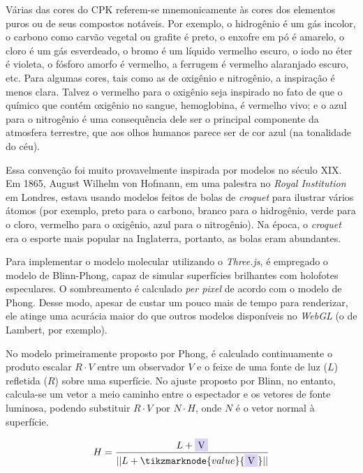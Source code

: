 Várias das cores do \gls{CPK} referem-se mnemonicamente às cores dos elementos puros ou de seus compostos notáveis. Por exemplo, o hidrogênio é um gás incolor, o carbono como carvão vegetal ou grafite é preto, o enxofre em pó é amarelo, o cloro é um gás esverdeado, o bromo é um líquido vermelho escuro, o iodo no éter é violeta, o fósforo amorfo é vermelho, a ferrugem é vermelho alaranjado escuro, etc. Para algumas cores, tais como as de oxigênio e nitrogênio, a inspiração é menos clara. Talvez o vermelho para o oxigênio seja inspirado no fato de que o químico que contém oxigênio no sangue, hemoglobina, é vermelho vivo; e o azul para o nitrogênio é uma consequência dele ser o principal componente da atmosfera terrestre, que aos olhos humanos parece ser de cor azul (na tonalidade do céu).

Essa convenção foi muito provavelmente inspirada por modelos no século XIX. Em 1865, August Wilhelm von Hofmann, em uma palestra no \textit{Royal Institution} em Londres, estava usando modelos feitos de bolas de \textit{croquet} para ilustrar vários átomos (por exemplo, preto para o carbono, branco para o hidrogênio, verde para o cloro, vermelho para o oxigênio, azul para o nitrogênio)\autocite{Crossland2004-ll}. Na época, o \textit{croquet} era o esporte mais popular na Inglaterra, portanto, as bolas eram abundantes.

Para implementar o modelo molecular utilizando o \textit{Three.js}, é empregado o modelo de Blinn-Phong, capaz de simular superfícies brilhantes com holofotes especulares. O sombreamento é calculado \textit{per pixel} de acordo com o modelo de Phong. Desse modo, apesar de custar um pouco mais de tempo para renderizar, ele atinge uma acurácia maior do que outros modelos disponíveis no \textit{WebGL} (o de Lambert, por exemplo).

No modelo primeiramente proposto por Phong, é calculado continuamente o produto escalar $R \cdot V$ entre um observador $V$ e o feixe de uma fonte de luz ($L$) refletida ($R$) sobre uma superfície. No ajuste proposto por Blinn, no entanto, calcula-se um vetor a meio caminho entre o espectador e os vetores de fonte luminosa, podendo substituir $R \cdot V$ por $N \cdot H$, onde $N$ é o vetor normal à superfície.

\begin{figure}[htb]
\begin{equation}
    \label{eq:R1}
    H = \frac{L + \highlight{blue}{V} }{||L + \tikzmarknode{value}{\highlight{blue}{V}}||}
\end{equation}
\vspace{2\baselineskip}
\end{figure}

